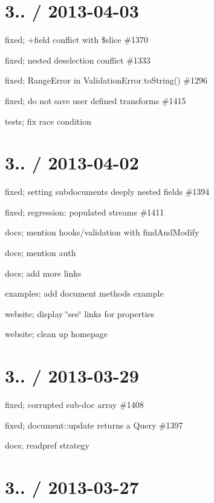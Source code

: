 \section*{3.. / 2013-\/04-\/03 }


\begin{DoxyItemize}
\item fixed; +field conflict with \$slice \#1370
\item fixed; nested deselection conflict \#1333
\item fixed; Range\+Error in Validation\+Error.\+to\+String() \#1296
\item fixed; do not save user defined transforms \#1415
\item tests; fix race condition
\end{DoxyItemize}

\section*{3.. / 2013-\/04-\/02 }


\begin{DoxyItemize}
\item fixed; setting subdocuments deeply nested fields \#1394
\item fixed; regression\+: populated streams \#1411
\item docs; mention hooks/validation with find\+And\+Modify
\item docs; mention auth
\item docs; add more links
\item examples; add document methods example
\item website; display \char`\"{}see\char`\"{} links for properties
\item website; clean up homepage
\end{DoxyItemize}

\section*{3.. / 2013-\/03-\/29 }


\begin{DoxyItemize}
\item fixed; corrupted sub-\/doc array \#1408
\item fixed; document\+::update returns a Query \#1397
\item docs; readpref strategy
\end{DoxyItemize}

\section*{3.. / 2013-\/03-\/27 }


